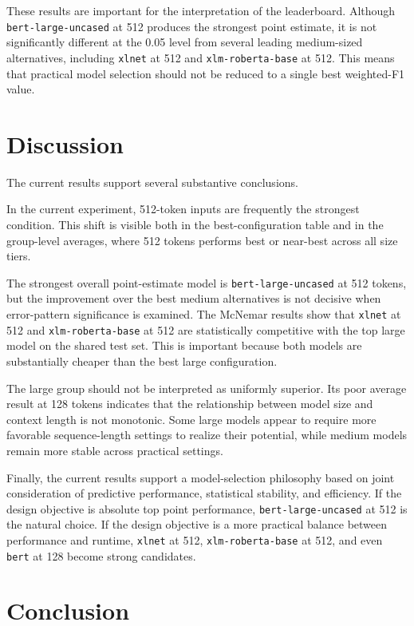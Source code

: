 \documentclass[11pt]{article}
\begin{document}
These results are important for the interpretation of the leaderboard. Although \texttt{bert-large-uncased} at 512 produces the strongest point estimate, it is not significantly different at the 0.05 level from several leading medium-sized alternatives, including \texttt{xlnet} at 512 and \texttt{xlm-roberta-base} at 512. This means that practical model selection should not be reduced to a single best weighted-F1 value.

\section{Discussion}

The current results support several substantive conclusions.

In the current experiment, 512-token inputs are frequently the strongest condition. This shift is visible both in the best-configuration table and in the group-level averages, where 512 tokens performs best or near-best across all size tiers.

The strongest overall point-estimate model is \texttt{bert-large-uncased} at 512 tokens, but the improvement over the best medium alternatives is not decisive when error-pattern significance is examined. The McNemar results show that \texttt{xlnet} at 512 and \texttt{xlm-roberta-base} at 512 are statistically competitive with the top large model on the shared test set. This is important because both models are substantially cheaper than the best large configuration.

The large group should not be interpreted as uniformly superior. Its poor average result at 128 tokens indicates that the relationship between model size and context length is not monotonic. Some large models appear to require more favorable sequence-length settings to realize their potential, while medium models remain more stable across practical settings.

Finally, the current results support a model-selection philosophy based on joint consideration of predictive performance, statistical stability, and efficiency. If the design objective is absolute top point performance, \texttt{bert-large-uncased} at 512 is the natural choice. If the design objective is a more practical balance between performance and runtime, \texttt{xlnet} at 512, \texttt{xlm-roberta-base} at 512, and even \texttt{bert} at 128 become strong candidates.

\section{Conclusion}
\end{document}
